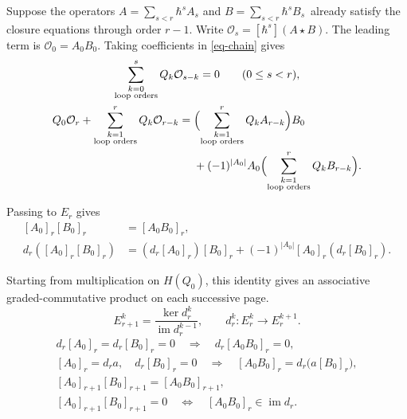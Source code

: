 \documentclass[11pt]{article}
\numberwithin{equation}{section}
\numberwithin{figure}{section}
\numberwithin{table}{section}
\begin{document}
Suppose the operators $A=\sum_{s<r}\hbar^sA_s$ and $B=\sum_{s<r}\hbar^sB_s$~already satisfy the closure equations through order $r-1$. Write $\mathcal O_s=[\hbar^s](A\star B)$. The leading term is $\mathcal O_0=A_0B_0$. Taking coefficients in \eqref{eq-chain} gives
\begin{equation}\label{eq-2-77}
\begin{gathered}
\sum_{\substack{k=0\\\text{loop orders}}}^{s}Q_k\mathcal O_{s-k}=0\qquad(0\le s<r),\\
\begin{aligned}
Q_0\mathcal O_r+\sum_{\substack{k=1\\\text{loop orders}}}^{r}Q_k\mathcal O_{r-k}
={}&\Bigl(\sum_{\substack{k=1\\\text{loop orders}}}^{r}Q_kA_{r-k}\Bigr)B_0\\
&+(-1)^{|A_0|}A_0\Bigl(\sum_{\substack{k=1\\\text{loop orders}}}^{r}Q_kB_{r-k}\Bigr).
\end{aligned}
\end{gathered}
\end{equation}

Passing to $E_r$ gives
\begin{equation}\label{eq-2-78}
\begin{aligned}
[A_0]_r[B_0]_r&=[A_0B_0]_r,\\
d_r([A_0]_r[B_0]_r)
&=(d_r[A_0]_r)[B_0]_r
+(-1)^{|A_0|}[A_0]_r(d_r[B_0]_r).
\end{aligned}
\end{equation}

Starting from multiplication on $H(Q_0)$, this identity gives an associative graded-commutative product on each successive page.
\begin{equation}\label{sentence-83f2db8a75f1b6ffe6de850c}
E_{r+1}^k=\frac{\ker d_r^k}{\operatorname{im}d_r^{k-1}},
\qquad d_r^k:E_r^k\to E_r^{k+1}.
\end{equation}
\begin{equation}\label{local-882cf329-2e67-4239-8e6d-1d9c611ce149}
\begin{gathered}
d_r[A_0]_r=d_r[B_0]_r=0\quad\Longrightarrow\quad d_r[A_0B_0]_r=0,\\
[A_0]_r=d_ra,\quad d_r[B_0]_r=0
\quad\Longrightarrow\quad
[A_0B_0]_r=d_r\bigl(a[B_0]_r\bigr),\\
[A_0]_{r+1}[B_0]_{r+1}=[A_0B_0]_{r+1},\\
[A_0]_{r+1}[B_0]_{r+1}=0
\quad\Longleftrightarrow\quad
[A_0B_0]_r\in\operatorname{im}d_r.
\end{gathered}
\end{equation}
\end{document}
